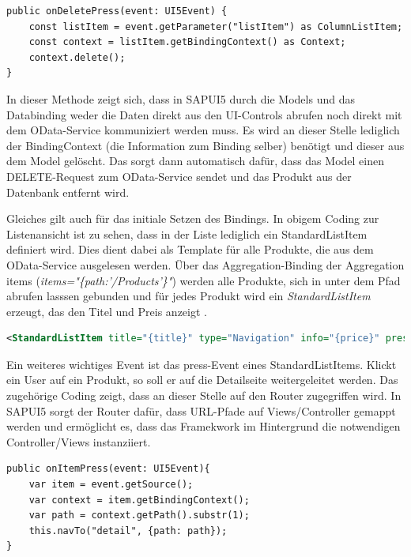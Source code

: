 \begin{lstlisting}[emph={event, UI5Event, listItem},  caption=Auszüge aus der Controller \texttt{Main.controller.ts}]
public onDeletePress(event: UI5Event) {
    const listItem = event.getParameter("listItem") as ColumnListItem;
    const context = listItem.getBindingContext() as Context;
    context.delete();
} 
\end{lstlisting}

In dieser Methode zeigt sich, dass in SAPUI5 durch die Models und das Databinding weder die Daten direkt aus den UI-Controls abrufen noch direkt mit dem OData-Service kommuniziert werden muss. Es wird an dieser Stelle lediglich der BindingContext (die Information zum Binding selber) benötigt und dieser aus dem Model gelöscht. Das sorgt dann automatisch dafür, dass das Model einen DELETE-Request zum OData-Service sendet und das Produkt aus der Datenbank entfernt wird.

Gleiches gilt auch für das initiale Setzen des Bindings. In obigem Coding zur Listenansicht ist zu sehen, dass in der Liste lediglich ein StandardListItem definiert wird. Dies dient dabei als Template für alle Produkte, die aus dem OData-Service ausgelesen werden. Über das Aggregation-Binding der Aggregation items (\textit{items="\{path:'/Products'\}"}) werden alle Produkte, sich in unter dem Pfad abrufen lasssen gebunden und für jedes Produkt wird ein \textit{StandardListItem} erzeugt, das den Titel und Preis anzeigt \cite{sud:s19}.

\begin{lstlisting}[language=XML,  caption=Auszüge aus der View \texttt{Main.view.xml}]
<StandardListItem title="{title}" type="Navigation" info="{price}" press="onItemPress"/>
\end{lstlisting}

Ein weiteres wichtiges Event ist das press-Event eines StandardListItems. Klickt ein User auf ein Produkt, so soll er auf die Detailseite weitergeleitet werden. Das zugehörige Coding zeigt, dass an dieser Stelle auf den Router zugegriffen wird. In SAPUI5 sorgt der Router dafür, dass URL-Pfade auf Views/Controller gemappt werden und ermöglicht es, dass das Framekwork im Hintergrund die notwendigen Controller/Views instanziiert.

\begin{lstlisting}[emph={event, UI5Event, listItem, detail, path}, caption=Auszüge aus der Controller \texttt{Main.controller.ts}]
public onItemPress(event: UI5Event){
    var item = event.getSource();
    var context = item.getBindingContext();
    var path = context.getPath().substr(1);
    this.navTo("detail", {path: path});
}
\end{lstlisting}


